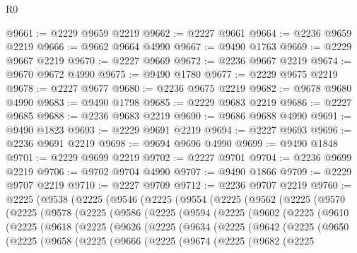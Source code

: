 \begin{lexlean}{R0}
\begin{coremodule}
@9661 := @2229 @9659 @2219
@9662 := @2227 @9661
@9664 := @2236 @9659 @2219
@9666 := @9662 @9664 @4990
@9667 := @9490 @1763
@9669 := @2229 @9667 @2219
@9670 := @2227 @9669
@9672 := @2236 @9667 @2219
@9674 := @9670 @9672 @4990
@9675 := @9490 @1780
@9677 := @2229 @9675 @2219
@9678 := @2227 @9677
@9680 := @2236 @9675 @2219
@9682 := @9678 @9680 @4990
@9683 := @9490 @1798
@9685 := @2229 @9683 @2219
@9686 := @2227 @9685
@9688 := @2236 @9683 @2219
@9690 := @9686 @9688 @4990
@9691 := @9490 @1823
@9693 := @2229 @9691 @2219
@9694 := @2227 @9693
@9696 := @2236 @9691 @2219
@9698 := @9694 @9696 @4990
@9699 := @9490 @1848
@9701 := @2229 @9699 @2219
@9702 := @2227 @9701
@9704 := @2236 @9699 @2219
@9706 := @9702 @9704 @4990
@9707 := @9490 @1866
@9709 := @2229 @9707 @2219
@9710 := @2227 @9709
@9712 := @2236 @9707 @2219
@9760 := @2225
    (@9538
      (@2225
        (@9546
          (@2225
            (@9554
              (@2225
                (@9562
                  (@2225
                    (@9570
                      (@2225
                        (@9578
                          (@2225
                            (@9586
                              (@2225
                                (@9594
                                  (@2225
                                    (@9602
                                      (@2225
                                        (@9610
                                          (@2225
                                            (@9618
                                              (@2225
                                                (@9626
                                                  (@2225
                                                    (@9634
                                                      (@2225
                                                        (@9642
                                                          (@2225
                                                            (@9650
                                                              (@2225
                                                                (@9658
                                                                  (@2225
                                                                    (@9666
                                                                      (@2225
                                                                        (@9674
                                                                          (@2225
                                                                            (@9682
                                                                              (@2225

\end{coremodule}
\end{lexlean}

